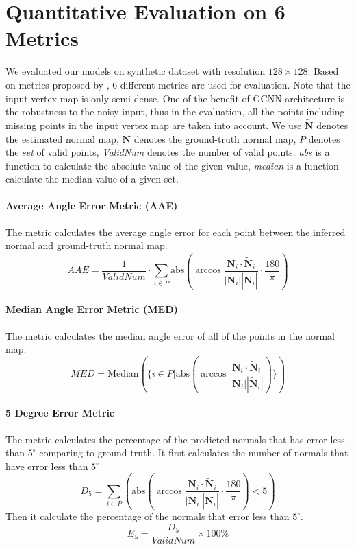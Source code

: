 \section{Quantitative Evaluation on 6 Metrics}
We evaluated our models on synthetic dataset with resolution $ 128\times 128 $. 
Based on metrics proposed by \cite{geometry_based_solution}, 6 different metrics are used for evaluation. Note that the input vertex map is only semi-dense. One of the benefit of GCNN architecture is the robustness to the noisy input, thus in the evaluation, all the points including missing points in the input vertex map are taken into account. We use $\tilde{\textbf{N}}$ denotes the estimated normal map, $ \textbf{N} $ denotes the ground-truth normal map, $ P $ denotes the \textit{set} of valid points, \textit{ValidNum} denotes the number of valid points. \textit{abs} is a function to calculate the absolute value of the given value, \textit{median} is a function calculate the median value of a given set.

\paragraph{Average Angle Error Metric (AAE)}
The metric calculates the average angle error for each point between the inferred normal and ground-truth normal map. 
\[ 
AAE = \frac
{1}
{ValidNum} \cdot \sum_{i\in P}  \text{abs}\left(   \arccos \frac{\textbf{N}_{i}\cdot \tilde{\textbf{N}}_{i}} {| \textbf{N}_{i} |  |\tilde{\textbf{N}}_{i}|  } \cdot  \frac{180}{\pi}   \right) 
\]

\paragraph{Median Angle Error Metric (MED)}
The metric calculates the median angle error of all of the points in the normal map.
\[ 
MED = 
\text{Median}   \left( \Bigg\{ i \in P \Bigg |  \text{abs}\left(\arccos \frac{\textbf{N}_{i}\cdot \tilde{\textbf{N}}_{i}} {| \textbf{N}_{i} |  |\tilde{\textbf{N}}_{i}|  } \right)   \Bigg\}\right)
\]

\paragraph{5 Degree Error Metric}
The metric calculates the percentage of the predicted normals that has error less than $ 5^\circ $ comparing to ground-truth. It first calculates the number of normals that have error less than $ 5^\circ $
\[
D_5 = \sum_{i\in P} \left( \text{abs}\left(   \arccos \frac{\textbf{N}_{i}\cdot \tilde{\textbf{N}}_{i}} {| \textbf{N}_{i} |  |\tilde{\textbf{N}}_{i}|  } \cdot  \frac{180}{\pi}   \right) < 5 \right)
\]
Then it calculate the percentage of the normals that error less than $ 5^\circ $.
\[ 
E_5 = \frac{D_5}{ValidNum}\times 100\%
\]



